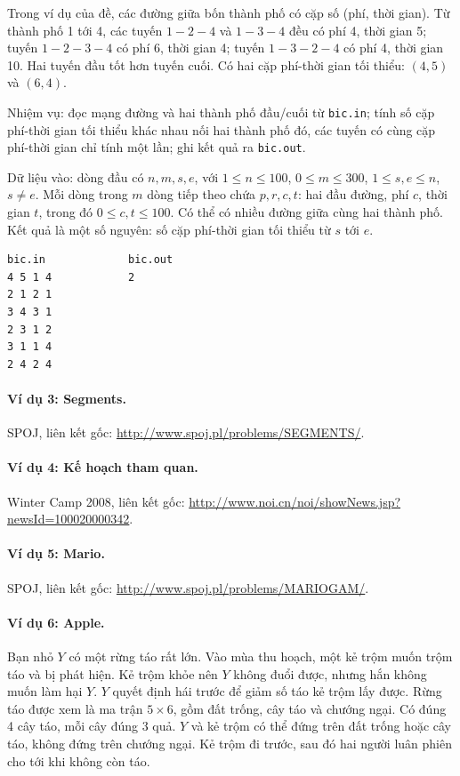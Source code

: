 \documentclass[11pt]{article}
\begin{document}
Trong ví dụ của đề, các đường giữa bốn thành phố có cặp số (phí, thời gian).
Từ thành phố 1 tới 4, các tuyến \(1-2-4\) và \(1-3-4\) đều có phí 4, thời gian
5; tuyến \(1-2-3-4\) có phí 6, thời gian 4; tuyến \(1-3-2-4\) có phí 4, thời
gian 10. Hai tuyến đầu tốt hơn tuyến cuối. Có hai cặp phí-thời gian tối thiểu:
\((4,5)\) và \((6,4)\).

Nhiệm vụ: đọc mạng đường và hai thành phố đầu/cuối từ \texttt{bic.in}; tính
số cặp phí-thời gian tối thiểu khác nhau nối hai thành phố đó, các tuyến có
cùng cặp phí-thời gian chỉ tính một lần; ghi kết quả ra \texttt{bic.out}.

Dữ liệu vào: dòng đầu có \(n,m,s,e\), với \(1\le n\le 100\), \(0\le m\le 300\),
\(1\le s,e\le n\), \(s\ne e\). Mỗi dòng trong \(m\) dòng tiếp theo chứa
\(p,r,c,t\): hai đầu đường, phí \(c\), thời gian \(t\), trong đó
\(0\le c,t\le 100\). Có thể có nhiều đường giữa cùng hai thành phố. Kết quả là
một số nguyên: số cặp phí-thời gian tối thiểu từ \(s\) tới \(e\).

\begin{verbatim}
bic.in             bic.out
4 5 1 4            2
2 1 2 1
3 4 3 1
2 3 1 2
3 1 1 4
2 4 2 4
\end{verbatim}

\paragraph{Ví dụ 3: Segments.}
SPOJ, liên kết gốc: \url{http://www.spoj.pl/problems/SEGMENTS/}.

\paragraph{Ví dụ 4: Kế hoạch tham quan.}
Winter Camp 2008, liên kết gốc:
\url{http://www.noi.cn/noi/showNews.jsp?newsId=100020000342}.

\paragraph{Ví dụ 5: Mario.}
SPOJ, liên kết gốc: \url{http://www.spoj.pl/problems/MARIOGAM/}.

\paragraph{Ví dụ 6: Apple.}
Bạn nhỏ \(Y\) có một rừng táo rất lớn. Vào mùa thu hoạch, một kẻ trộm muốn
trộm táo và bị phát hiện. Kẻ trộm khỏe nên \(Y\) không đuổi được, nhưng hắn
không muốn làm hại \(Y\). \(Y\) quyết định hái trước để giảm số táo kẻ trộm
lấy được. Rừng táo được xem là ma trận \(5\times 6\), gồm đất trống, cây táo
và chướng ngại. Có đúng 4 cây táo, mỗi cây đúng 3 quả. \(Y\) và kẻ trộm có
thể đứng trên đất trống hoặc cây táo, không đứng trên chướng ngại. Kẻ trộm đi
trước, sau đó hai người luân phiên cho tới khi không còn táo.
\end{document}
